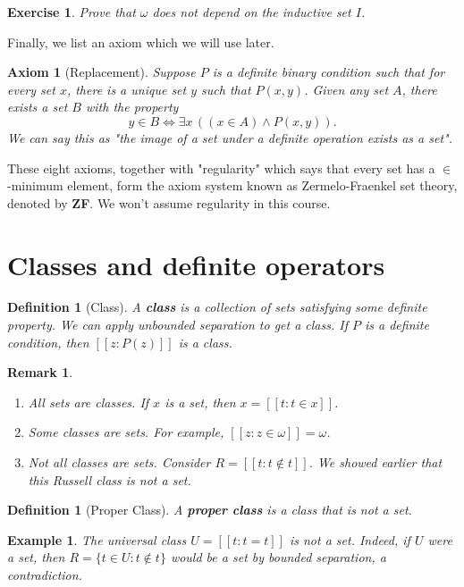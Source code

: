 \documentclass[10pt]{article}
\theoremstyle{newstyle}
\newtheorem{remark}[thm]{Remark}
\newtheorem{defn}[thm]{Definition}
\newtheorem{axiom}[thm]{Axiom}
\newtheorem{exercise}[thm]{Exercise}
\newtheorem{exmp}[thm]{Example}
\begin{document}
\begin{exercise}
Prove that $\omega$ does not depend on the inductive set $I$.
\end{exercise}

Finally, we list an axiom which we will use later. 

\begin{axiom}[Replacement] 
Suppose $P$ is a definite binary condition such that for every set $x$, there is a unique set $y$ 
such that $P(x, y)$. Given any set $A$, there exists a set $B$ with the property 
\[ y \in B \iff \exists x \, ((x \in A) \wedge P(x, y)). \] 
We can say this as "the image of a set under a definite operation exists as a set". 
\end{axiom} 

These eight axioms, together with "regularity" which says that every set has a 
$\in$-minimum element, form the axiom system known as 
Zermelo-Fraenkel set theory, denoted by {\bf ZF}. We won't assume regularity in this course. 

\newpage\section{Classes and definite operators} 

\begin{defn}[Class] 
A {\bf class} is a collection of sets satisfying some definite property. We can apply unbounded 
separation to get a class. If $P$ is a definite condition, then 
$[[ z : P(z)]]$ is a class. 
\end{defn}

\begin{remark}~  
\begin{enumerate}
    \item All sets are classes. If $x$ is a set, then $x = [[t : t \in x]]$. 
    \item Some classes are sets. For example, $[[z : z \in \omega]] = \omega$. 
    \item Not all classes are sets. Consider $R = [[t : t \notin t]]$. We showed earlier that 
    this Russell class is not a set. 
\end{enumerate}  
\end{remark}

\begin{defn}[Proper Class] 
A {\bf proper class} is a class that is not a set. 
\end{defn} 

\begin{exmp} 
The universal class $U = [[t : t = t]]$ is not a set. Indeed, if $U$ were a set, then 
$R = \{t \in U : t \notin t\}$ would be a set by bounded separation, a contradiction.
\end{exmp}
\end{document}
